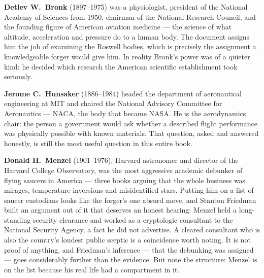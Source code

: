 \textbf{Detlev W.~Bronk} (1897--1975) was a physiologist, president of the National Academy of
Sciences from 1950, chairman of the National Research Council, and the founding figure of American
aviation medicine --- the science of what altitude, acceleration and pressure do to a human body.
The document assigns him the job of examining the Roswell bodies, which is precisely the
assignment a knowledgeable forger would give him. In reality Bronk's power was of a quieter kind:
he decided which research the American scientific establishment took seriously.

\textbf{Jerome C.~Hunsaker} (1886--1984) headed the department of aeronautical engineering at MIT
and chaired the National Advisory Committee for Aeronautics --- NACA, the body that became NASA.
He is the aerodynamics chair: the person a government would ask whether a described flight
performance was physically possible with known materials. That question, asked and answered
honestly, is still the most useful question in this entire book.

\textbf{Donald H.~Menzel} (1901--1976), Harvard astronomer and director of the Harvard College
Observatory, was the most aggressive academic debunker of flying saucers in America --- three books
arguing that the whole business was mirages, temperature inversions and misidentified stars.
Putting him on a list of saucer custodians looks like the forger's one absurd move, and
Stanton Friedman built an argument out of it that deserves an honest hearing: Menzel held a
long-standing security clearance and worked as a cryptologic consultant to the National Security
Agency, a fact he did not advertise. A cleared consultant who is also the country's loudest public
sceptic is a coincidence worth noting. It is not proof of anything, and Friedman's inference ---
that the debunking was assigned --- goes considerably further than the evidence. But note the
structure: Menzel is on the list because his real life had a compartment in it.

